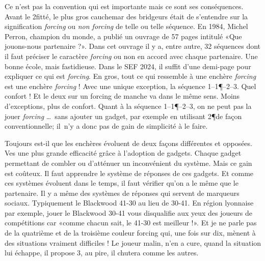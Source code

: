 Ce n'est pas la convention qui est importante mais ce sont ses conséquences. Avant le 2\NT fitté, le plus gros cauchemar des bridgeurs était de s'entendre sur la signification \textit{forcing } ou \textit{non forcing} de telle ou telle séquence. En 1984, Michel Perron, champion du monde, a publié un ouvrage de 57 pages intitulé «Que jouons-nous partenaire ?». Dans cet ouvrage il y a, entre autre, 32 séquences dont il faut préciser le caractère \textit{forcing} ou non en accord avec chaque partenaire. Une bonne école, mais fastidieuse.
Dans le SEF 2024, il suffit d'une demi-page pour expliquer ce qui est \textit{forcing}. En gros, tout ce qui ressemble à une enchère \textit{forcing} est une enchère \textit{forcing} ! Avec une unique exception, la séquence 1\C--1\P--2\C--3\C. Quel confort ! Et le deux sur un forcing de manche va dans le même sens. Moins d'exceptions, plus de confort. Quant à la séquence 1\C--1\P--2\C--3\C, on  ne peut pas la jouer \textit{forcing} \dots\ sans ajouter un gadget, par exemple en utilisant 2\P de façon conventionnelle; il n'y a donc pas de gain de simplicité à le faire.

Toujours est-il que les enchères évoluent de deux façons différentes et opposées. Ves une plus grande efficacité grâce à l'adoption de gadgets.
Chaque gadget permettant de combler  ou d'atténuer un inconvénient du système. Mais ce gain est coûteux. Il faut apprendre le système de réponses de ces gadgets. Et comme ces systèmes évoluent dans le temps, il faut vérifier qu'on a le même que le partenaire. Il y a même des systèmes de réponses qui servent de marqueurs sociaux. Typiquement le Blackwood 41-30 au lieu de 30-41. En région lyonnaise par exemple, jouer le Blackwood 30-41 vous disqualifie aux yeux des joueurs de compétitions car «comme chacun sait, le 41-30 est meilleur !».
Et je ne parle pas de la quatrième et de la troisième couleur forcing qui, une fois sur dix, mènent à des situations vraiment difficiles !
Le joueur malin, n'en a cure, quand la situation lui échappe, il propose 3\NT, au pire, il chutera comme les autres.

